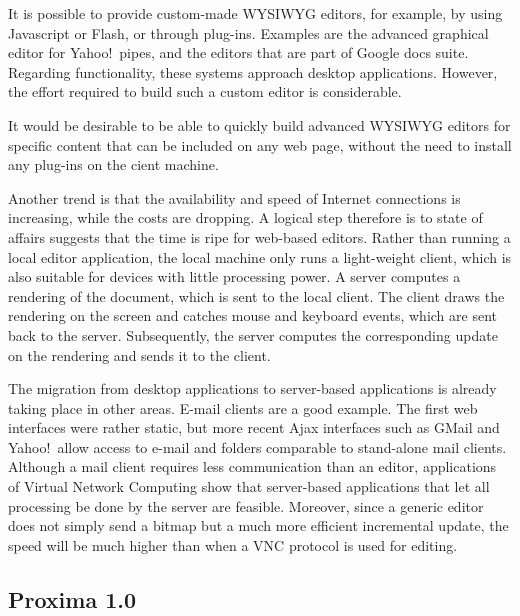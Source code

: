 \documentclass[10pt]{article}
\begin{document}
It is possible to provide custom-made WYSIWYG editors, for example, by using Javascript or Flash, or through plug-ins. Examples are the advanced graphical editor for Yahoo!\ pipes, and the editors that are part of Google docs suite. Regarding functionality, these systems approach desktop applications. However, the effort required to build such a custom editor is considerable.

It would be desirable to be able to quickly build advanced WYSIWYG editors for specific content that can be included on any web page, without the need to install any plug-ins on the cient machine.


\bc
Another trend is that the availability and speed of Internet connections is increasing, while the costs are dropping. A logical step therefore is to state of affairs suggests that the time is ripe for web-based editors. Rather than running a local editor application, the local machine only runs a light-weight client, which is also suitable for devices with little processing power. A server computes a rendering of the document, which is sent to the local client. The client draws the rendering on the screen and catches mouse and keyboard events, which are sent back to the server. Subsequently, the server computes the corresponding update on the rendering and sends it to the client.

The migration from desktop applications to server-based applications is already taking place in other areas. E-mail clients are a good example. The first web interfaces were rather static, but more recent Ajax interfaces such as GMail and Yahoo!\ allow access to e-mail and folders comparable to stand-alone mail clients. Although a mail client requires less communication than an editor, applications of Virtual Network Computing show that server-based applications that let all processing be done by the server are feasible. Moreover, since a generic editor does not simply send a bitmap but a much more efficient incremental update, the speed will be much higher than when a VNC protocol is used for editing. 
\ec

\subsection{Proxima 1.0}
\end{document}
